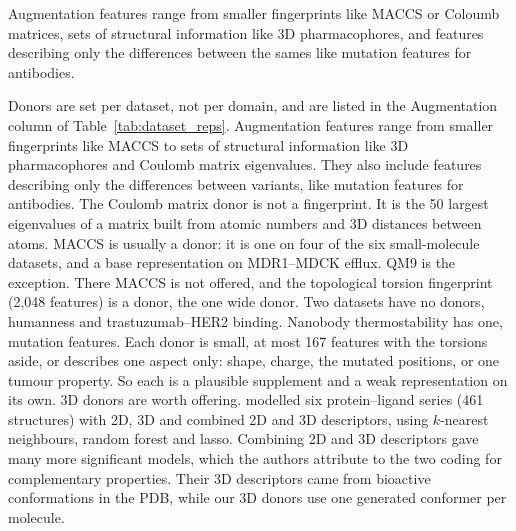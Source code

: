 Augmentation features range from smaller fingerprints like MACCS or Coloumb matrices, sets of structural information like 3D pharmacophores, and features describing only the differences between the sames like mutation features for antibodies.

Donors are set per dataset, not per domain, and are listed in the Augmentation column of Table~\ref{tab:dataset_reps}. Augmentation features range from smaller fingerprints like MACCS to sets of structural information like 3D pharmacophores and Coulomb matrix eigenvalues. They also include features describing only the differences between variants, like mutation features for antibodies. The Coulomb matrix donor is not a fingerprint. It is the 50 largest eigenvalues of a matrix built from atomic numbers and 3D distances between atoms. MACCS is usually a donor: it is one on four of the six small-molecule datasets, and a base representation on MDR1--MDCK efflux. QM9 is the exception. There MACCS is not offered, and the topological torsion fingerprint (2,048 features) is a donor, the one wide donor. Two datasets have no donors, humanness and trastuzumab--HER2 binding. Nanobody thermostability has one, mutation features. Each donor is small, at most 167 features with the torsions aside, or describes one aspect only: shape, charge, the mutated positions, or one tumour property. So each is a plausible supplement and a weak representation on its own. 3D donors are worth offering. \citet{Bahia2023} modelled six protein--ligand series (461 structures) with 2D, 3D and combined 2D and 3D descriptors, using $k$-nearest neighbours, random forest and lasso. Combining 2D and 3D descriptors gave many more significant models, which the authors attribute to the two coding for complementary properties. Their 3D descriptors came from bioactive conformations in the PDB, while our 3D donors use one generated conformer per molecule.


